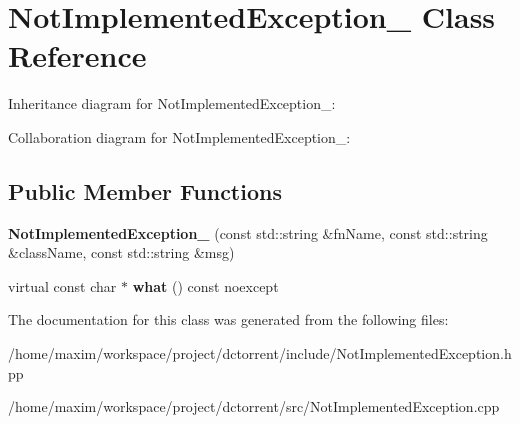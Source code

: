 \hypertarget{class_not_implemented_exception__}{}\section{Not\+Implemented\+Exception\+\_\+ Class Reference}
\label{class_not_implemented_exception__}


Inheritance diagram for Not\+Implemented\+Exception\+\_\+\+:


Collaboration diagram for Not\+Implemented\+Exception\+\_\+\+:
\subsection*{Public Member Functions}
\begin{DoxyCompactItemize}
\item 
\mbox{\label{class_not_implemented_exception___ab10428134a851c0f564d142a497b4d3f}} 
{\bfseries Not\+Implemented\+Exception\+\_\+} (const std\+::string \&fn\+Name, const std\+::string \&class\+Name, const std\+::string \&msg)
\item 
\mbox{\label{class_not_implemented_exception___a7a92099331b07ede1d316e8340ce207a}} 
virtual const char $\ast$ {\bfseries what} () const noexcept
\end{DoxyCompactItemize}


The documentation for this class was generated from the following files\+:\begin{DoxyCompactItemize}
\item 
/home/maxim/workspace/project/dctorrent/include/Not\+Implemented\+Exception.\+hpp\item 
/home/maxim/workspace/project/dctorrent/src/Not\+Implemented\+Exception.\+cpp\end{DoxyCompactItemize}
